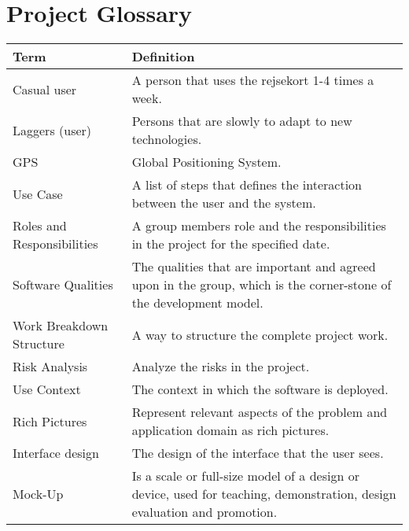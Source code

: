 \renewcommand{\headrulewidth}{0.1pt}
\renewcommand{\footrulewidth}{0.1pt}

\section*{Project Glossary}

\begin{center}
	\def\arraystretch{1.5}%
    \begin{tabular}{ | p{5cm} | p{5cm} |}
    \hline 
	\textbf{Term} & \textbf{Definition} \\ \hline
	
	Casual user & A person that  uses the rejsekort 1-4 times a week. \\ \hline
	
	Laggers (user)  & Persons that are slowly to adapt to new technologies. \\ \hline
	
	GPS & Global Positioning System.\\ \hline
	
	Use Case & A list of steps that defines the interaction between the user and the system. \\ \hline
	
	Roles and Responsibilities  & A group members role and the responsibilities in the project for the specified date. \\ \hline
	
	Software Qualities & The qualities that are important and agreed upon in the group, which is the corner-stone of the development model. \\ \hline
	
	Work Breakdown Structure & A way to structure the complete project work. \\ \hline
	
	Risk Analysis & Analyze the risks in the project. \\ \hline
	
	Use Context & The context in which the software is deployed. \\ \hline
	
	Rich Pictures & Represent relevant aspects of the problem and application domain as rich pictures. \\ \hline
	
	Interface design  & The design of the interface that the user sees. \\ \hline
	
	Mock-Up & Is a scale or full-size model of a design or device, used for teaching, demonstration, design evaluation and promotion. \\

    \hline
    \end{tabular}
\end{center}